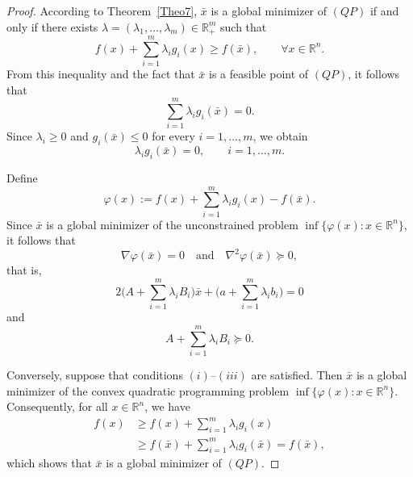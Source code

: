 \documentclass[10pt,a4paper]{amsart}
\begin{document}
	\begin{proof}
		According to Theorem~\ref{Theo7}, $\bar x$ is a global minimizer of $(QP)$ if and only if there exists
		$\lambda=(\lambda_1,\ldots,\lambda_m)\in \mathbb{R}^m_+$ such that
		\begin{equation}\label{e12}
			f(x)+\sum_{i=1}^{m}\lambda_i g_i(x)\geq f(\bar x), \qquad \forall x\in \mathbb{R}^n.
		\end{equation}
		From this inequality and the fact that $\bar x$ is a feasible point of $(QP)$, it follows that
		\begin{equation}\label{e13}
			\sum_{i=1}^{m}\lambda_i g_i(\bar x)=0.
		\end{equation}
		Since $\lambda_i\geq 0$ and $g_i(\bar x)\leq 0$ for every $i=1,\ldots,m$, we obtain
		\begin{equation}\label{e14}
			\lambda_i g_i(\bar x)=0, \qquad i=1,\ldots,m.
		\end{equation}
		
		Define
		$$\varphi(x):=f(x)+\sum_{i=1}^{m}\lambda_i g_i(x)-f(\bar x).$$
		Since $\bar x$ is a global minimizer of the unconstrained problem
		$\inf\{\varphi(x): x\in \mathbb{R}^n\}$, it follows that
		$$\nabla \varphi(\bar x)=0
		\quad \text{and} \quad
		\nabla^2 \varphi(\bar x)\succeq 0,$$
		that is,
		$$2\bigg(A+\sum_{i=1}^{m}\lambda_i B_i\bigg)\bar x
		+\bigg(a+\sum_{i=1}^{m}\lambda_i b_i\bigg)=0$$
		and
		$$A+\sum_{i=1}^{m}\lambda_i B_i\succeq 0.$$
		
		Conversely, suppose that conditions $(i)$--$(iii)$ are satisfied.
		Then $\bar x$ is a global minimizer of the convex quadratic programming problem
		$\inf\{\varphi(x): x\in \mathbb{R}^n\}$.
		Consequently, for all $x\in \mathbb{R}^n$, we have
		\begin{align*}
			f(x)
			&\geq f(x)+\sum_{i=1}^{m}\lambda_i g_i(x) \\
			&\geq f(\bar x)+\sum_{i=1}^{m}\lambda_i g_i(\bar x)
			= f(\bar x),
		\end{align*}
		which shows that $\bar x$ is a global minimizer of $(QP)$.
	\end{proof}
\end{document}
